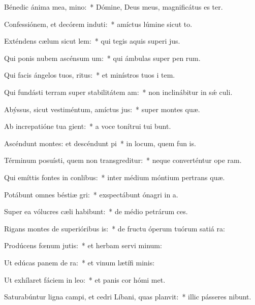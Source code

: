 \item Bénedic ánima mea, mino:~* Dómine, Deus meus, magnificátus es ter.
\item Confessiónem, et decórem induti:~* amíctus lúmine sicut to.
\item Exténdens cælum sicut lem:~* qui tegis aquis superi jus.
\item Qui ponis nubem ascénsum um:~* qui ámbulas super pen rum.
\item Qui facis ángelos tuos, ritus:~* et minístros tuos i tem.
\item Qui fundásti terram super stabilitátem am:~* non inclinábitur in sǽ culi.
\item Abýssus, sicut vestiméntum, amíctus jus:~* super montes  quæ.
\item Ab increpatióne tua gient:~* a voce tonítrui tui bunt.
\item Ascéndunt montes: et descéndunt pi~* in locum, quem fun is.
\item Términum posuísti, quem non transgreditur:~* neque converténtur ope ram.
\item Qui emíttis fontes in conlibus:~* inter médium móntium pertrans quæ.
\item Potábunt omnes béstiæ gri:~* exspectábunt ónagri in  a.
\item Super ea vólucres cæli habibunt:~* de médio petrárum  ces.
\item Rigans montes de superióribus is:~* de fructu óperum tuórum satiá ra:
\item Prodúcens fœnum jutis:~* et herbam servi minum:
\item Ut edúcas panem de ra:~* et vinum lætífi  minis:
\item Ut exhílaret fáciem in leo:~* et panis cor hómi met.
\item Saturabúntur ligna campi, et cedri Líbani, quas planvit:~* illic pásseres nibunt.
